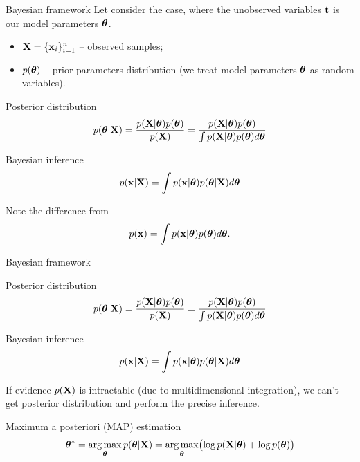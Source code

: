 \begin{frame}{Bayesian framework}
	Let consider the case, where the unobserved variables $\mathbf{t}$ is our model parameters $\boldsymbol{\theta}$.
	\begin{itemize}
		\item $\mathbf{X} = \{\mathbf{x}_i\}_{i=1}^n$ -- observed samples;
		\item $p(\boldsymbol{\theta})$ -- prior parameters distribution (we treat model parameters $\boldsymbol{\theta}$ as random variables).
	\end{itemize}
	\begin{block}{Posterior distribution}
		\[
			p(\boldsymbol{\theta} | \mathbf{X}) = \frac{p(\mathbf{X} | \boldsymbol{\theta}) p(\boldsymbol{\theta})}{p(\mathbf{X})} = \frac{p(\mathbf{X} | \boldsymbol{\theta}) p(\boldsymbol{\theta})}{\int p(\mathbf{X} | \boldsymbol{\theta}) p(\boldsymbol{\theta}) d \boldsymbol{\theta}} 
		\]
		\vspace{-0.2cm}
	\end{block}
	\begin{block}{Bayesian inference}
		\vspace{-0.2cm}
		\[
			p(\mathbf{x} | \mathbf{X}) = \int p(\mathbf{x} | \boldsymbol{\theta}) p(\boldsymbol{\theta} | \mathbf{X}) d \boldsymbol{\theta}
		\]
	\end{block}
 	Note the difference from
	 	\[
	 		p(\mathbf{x}) = \int p(\mathbf{x} | \boldsymbol{\theta}) p(\boldsymbol{\theta}) d \boldsymbol{\theta}.
	 	\]
\end{frame}
\begin{frame}{Bayesian framework}
	\begin{block}{Posterior distribution}
		\[
		p(\boldsymbol{\theta} | \mathbf{X}) = \frac{p(\mathbf{X} | \boldsymbol{\theta}) p(\boldsymbol{\theta})}{p(\mathbf{X})} = \frac{p(\mathbf{X} | \boldsymbol{\theta}) p(\boldsymbol{\theta})}{\int p(\mathbf{X} | \boldsymbol{\theta}) p(\boldsymbol{\theta}) d \boldsymbol{\theta}} 
		\]
		\vspace{-0.2cm}
	\end{block}
	\begin{block}{Bayesian inference}
		\vspace{-0.2cm}
		\[
		p(\mathbf{x} | \mathbf{X}) = \int p(\mathbf{x} | \boldsymbol{\theta}) p(\boldsymbol{\theta} | \mathbf{X}) d \boldsymbol{\theta}
		\]
	\end{block}
	If evidence $p(\mathbf{X})$ is intractable (due to multidimensional integration), we can't get posterior distribution and perform the precise inference.
    \begin{block}{Maximum a posteriori (MAP) estimation}
    \vspace{-0.2cm}
    \[
        \boldsymbol{\theta}^* = \operatorname*{arg\,max}_{\boldsymbol{\theta}} p(\boldsymbol{\theta} | \mathbf{X}) = \operatorname*{arg\,max}_{\boldsymbol{\theta}} \bigl(\log p(\mathbf{X} | \boldsymbol{\theta}) + \log p(\boldsymbol{\theta}) \bigr)
    \]
    \end{block}
\end{frame}
